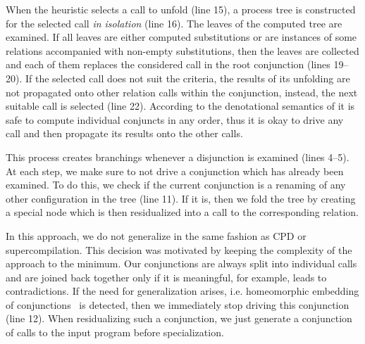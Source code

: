 When the heuristic selects a call to unfold (line 15), a process tree is constructed for the selected call \emph{in isolation} (line 16).
The leaves of the computed tree are examined.
If all leaves are either computed substitutions or are instances of some relations accompanied with non-empty substitutions, then the leaves are collected and each of them replaces the considered call in the root conjunction (lines 19--20).
If the selected call does not suit the criteria, the results of its unfolding are not propagated onto other relation calls within the conjunction, instead, the next suitable call is selected (line 22).
According to the denotational semantics of \mk it is safe to compute individual conjuncts in any order, thus it is okay to drive any call and then propagate its results onto the other calls.


This process creates branchings whenever a disjunction is examined (lines 4--5).
At each step, we make sure to not drive a conjunction which has already been examined.
To do this, we check if the current conjunction is a renaming of any other configuration in the tree (line 11).
If it is, then we fold the tree by creating a special node which is then residualized into a call to the corresponding relation.

In this approach, we do not generalize in the same fashion as CPD or supercompilation.
This decision was motivated by keeping the complexity of the approach to the minimum.
Our conjunctions are always split into individual calls and are joined back together only if it is meaningful, for example, leads to contradictions.
If the need for generalization arises, i.e. homeomorphic embedding of conjunctions~\cite{de1999conjunctive} is detected, then we immediately stop driving this conjunction (line 12).
When residualizing such a conjunction, we just generate a conjunction of calls to the input program before specialization.



